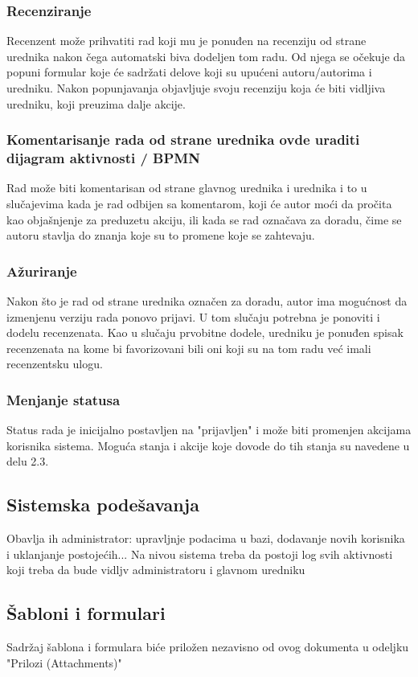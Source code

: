\documentclass[a4paper]{article}
\begin{document}
\subsubsection{Recenziranje}
Recenzent može prihvatiti rad koji mu je ponuđen na recenziju od strane urednika nakon čega automatski biva dodeljen tom radu. Od njega se očekuje da popuni formular koje će sadržati delove koji su upućeni autoru/autorima i uredniku. Nakon popunjavanja objavljuje svoju recenziju koja će biti vidljiva uredniku, koji preuzima dalje akcije.
\subsubsection{Komentarisanje rada od strane urednika ovde uraditi dijagram aktivnosti / BPMN}
Rad može biti komentarisan od strane glavnog urednika i urednika i to u slučajevima kada je rad odbijen sa komentarom, koji će autor moći da pročita kao objašnjenje za preduzetu akciju, ili kada se rad označava za doradu, čime se autoru stavlja do znanja koje su to promene koje se zahtevaju.
\subsubsection{Ažuriranje}
Nakon što je rad od strane urednika označen za doradu, autor ima mogućnost da izmenjenu verziju rada ponovo prijavi. U tom slučaju potrebna je ponoviti i dodelu recenzenata. Kao u slučaju prvobitne dodele, uredniku je ponuđen spisak recenzenata na kome bi favorizovani bili oni koji su na tom radu već imali recenzentsku ulogu.
\subsubsection{Menjanje statusa}
Status rada je inicijalno postavljen na "prijavljen" i može biti promenjen akcijama korisnika sistema. Moguća stanja i akcije koje dovode do tih stanja su navedene u delu 2.3.

    
\subsection{Sistemska podešavanja}
Obavlja ih administrator: upravljnje podacima u bazi, dodavanje novih korisnika i uklanjanje postojećih... Na nivou sistema treba da postoji log svih aktivnosti koji treba da bude vidljv administratoru i glavnom uredniku

\subsection{Šabloni i formulari}
Sadržaj šablona i formulara biće priložen nezavisno od ovog dokumenta u odeljku "Prilozi (Attachments)"
\end{document}
